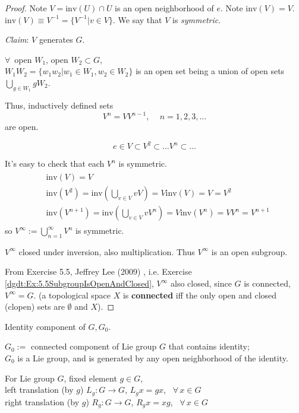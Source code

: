 \begin{proof}
	Note $V = \text{inv}(U) \cap U$ is an open neighborhood of $e$. Note $\text{inv}(V) =V$. $\text{inv}(V) \equiv V^{-1} = \lbrace V^{-1} | v \in V \rbrace$. We say that $V$ is \emph{symmetric}.
	
	\emph{Claim}: $V$ generates $G$.
	
	$\forall \, $ open $W_1$, open $W_2\subset G$, \\
	$W_1W_2 = \lbrace w_1 w_2 | w_1 \in W_1, w_2 \in W_2 \rbrace$ is an open set being a union of open sets $\bigcup_{g\in W_1} gW_2$.
	
	Thus, inductively defined sets
	\[
	V^n = VV^{n-1}, \quad \, n = 1,2,3,\dots
	\]
	are open.
	
	\[
	e \in V \subset V^2 \subset \dots V^n \subset \dots
	\]
	
	It's easy to check that each $V^n$ is symmetric.
	\[
	\begin{gathered}
	\begin{aligned}
	& \text{inv}(V) = V \\
	& \text{inv}(V^2) = \text{inv}( \bigcup_{v\in V} vV) = V \text{inv}(V) = V = V^2 \\
	& \text{inv}(V^{n+1}) = \text{inv}\left( \bigcup_{v\in V} vV^n \right) = V \text{inv}(V^n) = VV^n = V^{n+1}
	\end{aligned}
	\end{gathered}	
	\]
	so $V^{\infty} := \bigcup_{n=1}^{\infty} V^n$ is symmetric.

$V^{\infty}$ closed under inversion, also multiplication. Thus $V^{\infty}$ is an open subgroup.

From Exercise 5.5, Jeffrey Lee (2009) \cite{dgdt:JLee2009}, i.e. Exercise \ref{dgdt:Ex:5.5SubgroupIsOpenAndClosed}, $V^{\infty}$ also closed, since $G$ is connected, $V^{\infty} = G$. (a topological space $X$ is \textbf{connected} iff the only open and closed (clopen) sets are $\emptyset$ and $X$).
	
\end{proof}

\begin{definition}
	Identity component of $G, G_0$.  

$G_0 := $ connected component of Lie group $G$ that contains identity; \\
$G_0$ is a Lie group, and is generated by any open neighborhood of the identity.
\end{definition}

\begin{definition}
	For Lie group $G$, fixed element $g\in G$, \\
	left translation (by $g$) $L_g: G \to G$, $L_g x  = gx$, \quad \, $\forall \, x \in G$ \\
	right translation (by $g$) $R_g: G \to G$, $R_g x  = xg$, \quad \, $\forall \, x \in G$ 
\end{definition}

